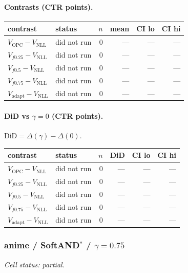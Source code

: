 \documentclass[10pt,a4paper]{article}
\begin{document}
\paragraph{Contrasts (CTR points).}
{\centering\small\begin{tabular}{llrrrr}
\toprule contrast & status & $n$ & mean & CI lo & CI hi \\
\midrule
$V_{\mathrm{OPC}}-V_{\mathrm{NLL}}$ & did not run & 0 & --- & --- & --- \\
$V_{f0.25}-V_{\mathrm{NLL}}$ & did not run & 0 & --- & --- & --- \\
$V_{f0.5}-V_{\mathrm{NLL}}$ & did not run & 0 & --- & --- & --- \\
$V_{f0.75}-V_{\mathrm{NLL}}$ & did not run & 0 & --- & --- & --- \\
$V_{\mathrm{adapt}}-V_{\mathrm{NLL}}$ & did not run & 0 & --- & --- & --- \\
\bottomrule\end{tabular}\par}
\paragraph{DiD vs $\gamma=0$ (CTR points).} $\mathrm{DiD}=\Delta(\gamma)-\Delta(0)$.
{\centering\small\begin{tabular}{llrrrr}
\toprule contrast & status & $n$ & DiD & CI lo & CI hi \\
\midrule
$V_{\mathrm{OPC}}-V_{\mathrm{NLL}}$ & did not run & 0 & --- & --- & --- \\
$V_{f0.25}-V_{\mathrm{NLL}}$ & did not run & 0 & --- & --- & --- \\
$V_{f0.5}-V_{\mathrm{NLL}}$ & did not run & 0 & --- & --- & --- \\
$V_{f0.75}-V_{\mathrm{NLL}}$ & did not run & 0 & --- & --- & --- \\
$V_{\mathrm{adapt}}-V_{\mathrm{NLL}}$ & did not run & 0 & --- & --- & --- \\
\bottomrule\end{tabular}\par}
\bigskip
\subsubsection{anime / SoftAND$^*$ / $\gamma=0.75$}
\emph{Cell status: partial}.
\end{document}
